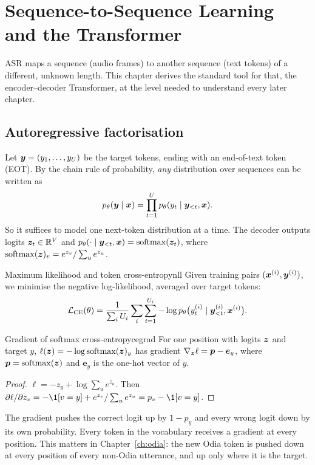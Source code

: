 \chapter{Sequence-to-Sequence Learning and the Transformer}
\label{ch:seq2seq}

ASR maps a sequence (audio frames) to another sequence (text tokens) of a different, unknown length. This chapter derives the
standard tool for that, the encoder--decoder Transformer, at the level needed to understand every later chapter.

\section{Autoregressive factorisation}

Let $\bm{y}=(y_1,\dots,y_U)$ be the target tokens, ending with an end-of-text token  (EOT). By the chain rule of
probability, \emph{any} distribution over sequences can be written as
\[
p_\theta(\bm{y}\mid\bm{x})=\prod_{t=1}^{U}p_\theta(y_t\mid \bm{y}_{<t},\bm{x}).
\]
So it suffices to model one next-token distribution at a time. The decoder outputs logits $\bm{z}_t\in\mathbb{R}^V$ and
$p_\theta(\cdot\mid\bm{y}_{<t},\bm{x})=\operatorname{softmax}(\bm{z}_t)$, where $\operatorname{softmax}(\bm{z})_v=e^{z_v}/\sum_{u}e^{z_u}$.

\begin{definition}{Maximum likelihood and token cross-entropy}{nll}
Given training pairs $(\bm{x}^{(i)},\bm{y}^{(i)})$, we minimise the negative log-likelihood, averaged over target tokens:
\[
\mathcal L_{\text{CE}}(\theta)=\frac{1}{\sum_i U_i}\sum_i\sum_{t=1}^{U_i}-\log p_\theta\big(y^{(i)}_t\mid \bm{y}^{(i)}_{<t},\bm{x}^{(i)}\big).
\]
\end{definition}

\begin{proposition}{Gradient of softmax cross-entropy}{cegrad}
For one position with logits $\bm{z}$ and target $y$, $\ell(\bm{z})=-\log\operatorname{softmax}(\bm{z})_y$ has gradient $\nabla_{\bm{z}}\ell=\bm p-\bm e_y$,
where $\bm p=\operatorname{softmax}(\bm{z})$ and $\bm e_y$ is the one-hot vector of $y$.
\end{proposition}
\begin{proof}
$\ell=-z_y+\log\sum_u e^{z_u}$. Then $\partial\ell/\partial z_v=-\1[v=y]+e^{z_v}/\sum_u e^{z_u}=p_v-\1[v=y]$.
\end{proof}

\begin{intuition}
The gradient pushes the correct logit up by $1-p_y$ and every wrong logit down by its own probability. Every token in the vocabulary
receives a gradient at every position. This matters in Chapter~\ref{ch:odia}: the new Odia token is pushed down at every position
of every non-Odia utterance, and up only where it is the target.
\end{intuition}

